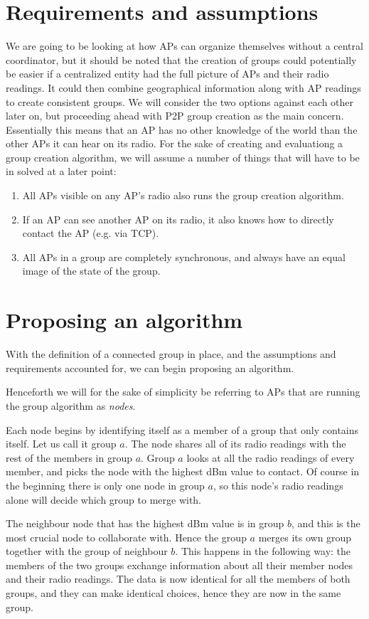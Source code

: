 \documentclass[a4paper,UKenglish]{report}
\begin{document}
\section{Requirements and assumptions}
We are going to be looking at how APs can organize themselves without a central coordinator,
but it should be noted that the creation of groups could potentially be easier if a centralized entity had the full picture of APs and their radio readings.
It could then combine geographical information along with AP readings to create consistent groups.
We will consider the two options against each other later on, but proceeding ahead with P2P group creation as the main concern. 
Essentially this means that an AP has no other knowledge of the world than the other APs it can hear on its radio.
For the sake of creating and evaluationg a group creation algorithm, we will assume a number of things that will have to be in solved at a later point:
\begin{enumerate}
	\item All APs visible on any AP's radio also runs the group creation algorithm.
	\item If an AP can see another AP on its radio, it also knows how to directly contact the AP (e.g. via TCP).
	\item All APs in a group are completely synchronous, and always have an equal image of the state of the group. 
\end{enumerate}

\section{Proposing an algorithm}\label{algorithm}
With the definition of a connected group in place, and the assumptions and requirements accounted for, we can begin proposing an algorithm.

Henceforth we will for the sake of simplicity be referring to APs that are running the group algorithm as \textit{nodes}.

Each node begins by identifying itself as a member of a group that only contains itself. Let us call it group $a$. The node shares all of
its radio readings with the rest of the members in group $a$. Group $a$ looks at all the radio readings of every member, and picks the node with the highest dBm value
to contact. Of course in the beginning there is only one node in group $a$, so this node's radio readings alone will decide which group to merge with. 

The neighbour node that has the highest dBm value is in group $b$, and this is the most crucial node to collaborate with. Hence the group $a$ merges its own group together
with the group of neighbour $b$. This happens in the following way: the members of the two groups exchange information about all their member nodes and their radio readings.
The data is now identical for all the members of both groups, and they can make identical choices, hence they are now in the same group. 
\end{document}
